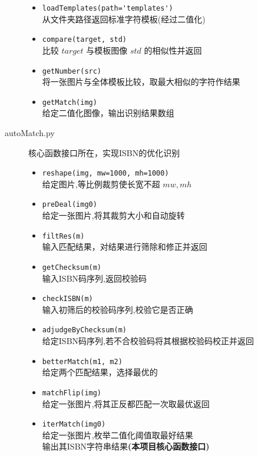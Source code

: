 \documentclass{ctexart}
\begin{document}
\begin{description}
    \begin{itemize}
        \item \verb|loadTemplates(path='templates')| \\
        从文件夹路径返回标准字符模板(经过二值化)
        \item \verb|compare(target, std)| \\
        比较 $target$ 与模板图像 $std$ 的相似性并返回
        \item \verb|getNumber(src)| \\
        将一张图片与全体模板比较，取最大相似的字符作结果
        \item \verb|getMatch(img)| \\
        给定二值化图像，输出识别结果数组
    \end{itemize}
    \item[autoMatch.py] 核心函数接口所在，实现ISBN的优化识别
    \begin{itemize}
        \item \verb|reshape(img, mw=1000, mh=1000)| \\
        给定图片,等比例裁剪使长宽不超 $mw,mh$
        \item \verb|preDeal(img0)| \\
        给定一张图片,将其裁剪大小和自动旋转
        \item \verb|filtRes(m)| \\
        输入匹配结果，对结果进行筛除和修正并返回
        \item \verb|getChecksum(m)| \\
        输入ISBN码序列,返回校验码
        \item \verb|checkISBN(m)| \\
        输入初筛后的校验码序列,校验它是否正确
        \item \verb|adjudgeByChecksum(m)| \\
        给定ISBN码序列,若不合校验码将其根据校验码校正并返回
        \item \verb|betterMatch(m1, m2)| \\
        给定两个匹配结果，选择最优的
        \item \verb|matchFlip(img)| \\
        给定一张图片,将其正反都匹配一次取最优返回
        \item \verb|iterMatch(img0)| \\
        给定一张图片,枚举二值化阈值取最好结果\\
        输出其ISBN字符串结果\textbf{(本项目核心函数接口)}
    \end{itemize}
\end{description}
\end{document}

